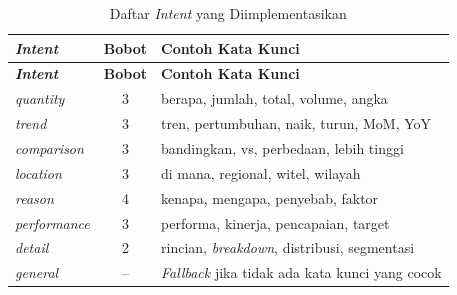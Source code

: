 \begin{longtable}{|p{2.5cm}|c|p{7.5cm}|}
\caption{Daftar \textit{Intent} yang Diimplementasikan} \label{tab:intent-impl} \\
\hline
\textbf{\textit{Intent}} & \textbf{Bobot} & \textbf{Contoh Kata Kunci} \\
\hline
\endfirsthead
\hline
\textbf{\textit{Intent}} & \textbf{Bobot} & \textbf{Contoh Kata Kunci} \\
\hline
\endhead
\hline
\endfoot
\textit{quantity} & 3 & berapa, jumlah, total, volume, angka \\
\hline
\textit{trend} & 3 & tren, pertumbuhan, naik, turun, MoM, YoY \\
\hline
\textit{comparison} & 3 & bandingkan, vs, perbedaan, lebih tinggi \\
\hline
\textit{location} & 3 & di mana, regional, witel, wilayah \\
\hline
\textit{reason} & 4 & kenapa, mengapa, penyebab, faktor \\
\hline
\textit{performance} & 3 & performa, kinerja, pencapaian, target \\
\hline
\textit{detail} & 2 & rincian, \textit{breakdown}, distribusi, segmentasi \\
\hline
\textit{general} & -- & \textit{Fallback} jika tidak ada kata kunci yang cocok \\
\hline
\end{longtable}
